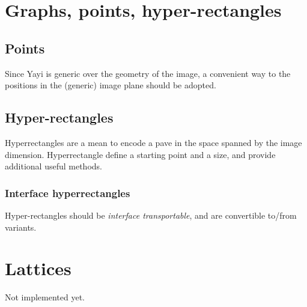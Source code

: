 \chapter{Graphs, points, hyper-rectangles}
\label{chap:graph:points:rectangles}


\section{Points}
\label{sec:points}
Since Yayi is generic over the geometry of the image, a convenient way to the positions in the (generic) image plane should be adopted. 



\section{Hyper-rectangles}
\label{hyperrectangles}
Hyperrectangles are a mean to encode a pave in the space spanned by the image dimension. Hyperrectangle define a starting point and a size, and provide additional useful methods. 

\subsection{Interface hyperrectangles}
Hyper-rectangles should be \textit{interface transportable}, and are convertible to/from variants. 


\chapter{Lattices}
\label{lattice}

Not implemented yet. 